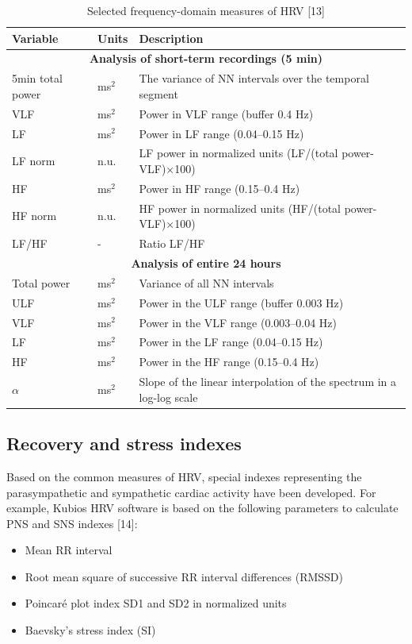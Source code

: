 \documentclass{article}
\begin{document}
\begin{table}[h]
\centering
\caption{Selected frequency-domain measures of HRV [13]}
\label{tab:HRV_freq}
\begin{tabular}{|l|l|l|}
\hline
\textbf{Variable} & \textbf{Units} & \textbf{Description} \\ \hline
\multicolumn{3}{|c|}{\textbf{Analysis of short-term recordings (5 min)}} \\ \hline
5min total power & ms$^2$ & The variance of NN intervals over the temporal segment \\ \hline
VLF & ms$^2$ & Power in VLF range (buffer 0.4 Hz) \\ \hline
LF & ms$^2$ & Power in LF range (0.04–0.15 Hz) \\ \hline
LF norm & n.u. & LF power in normalized units (LF/(total power-VLF)×100) \\ \hline
HF & ms$^2$ & Power in HF range (0.15–0.4 Hz) \\ \hline
HF norm & n.u. & HF power in normalized units (HF/(total power-VLF)×100) \\ \hline
LF/HF & - & Ratio LF/HF \\ \hline
\multicolumn{3}{|c|}{\textbf{Analysis of entire 24 hours}} \\ \hline
Total power & ms$^2$ & Variance of all NN intervals \\ \hline
ULF & ms$^2$ & Power in the ULF range (buffer 0.003 Hz) \\ \hline
VLF & ms$^2$ & Power in the VLF range (0.003–0.04 Hz) \\ \hline
LF & ms$^2$ & Power in the LF range (0.04–0.15 Hz) \\ \hline
HF & ms$^2$ & Power in the HF range (0.15–0.4 Hz) \\ \hline
$\alpha$ & ms$^2$ & Slope of the linear interpolation of the spectrum in a log-log scale \\ \hline
\end{tabular}
\end{table}

\subsection{Recovery and stress indexes}
Based on the common measures of HRV, special indexes representing the parasympathetic
and sympathetic cardiac activity have been developed. For example, Kubios HRV software
is based on the following parameters to calculate PNS and SNS indexes [14]:


\begin{itemize}
\item Mean RR interval
\item Root mean square of successive RR interval differences (RMSSD)
\item Poincaré plot index SD1 and SD2 in normalized units
\item Baevsky’s stress index (SI)
\end{itemize}
\end{document}

